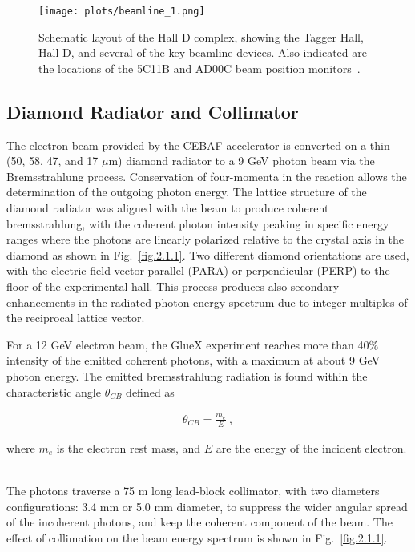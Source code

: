 {\begin{figure}[H]
    \centering
        \texttt{[image: plots/beamline\_1.png]}
        \caption{Schematic layout of the Hall D complex, showing the Tagger Hall, Hall D, and several of the key beamline devices. Also indicated are the locations of the 5C11B and AD00C beam position monitors~\cite{Charles16}.}
        \label{fig.2.1}
\end{figure}

\subsection{Diamond Radiator and Collimator}
\label{p.2.1.1}

The electron beam provided by the CEBAF accelerator is converted on a thin (50, 58, 47, and 17 $\mu$m) diamond radiator to a 9 GeV photon beam via the Bremsstrahlung process. Conservation of four-momenta in the reaction allows the determination of the outgoing photon energy. The lattice structure of the diamond radiator was aligned with the beam to produce coherent bremsstrahlung, with the coherent photon intensity peaking in specific energy ranges where the photons are linearly polarized relative to the crystal axis in the diamond as shown in Fig.~\ref{fig.2.1.1}. Two different diamond orientations are used, with the electric field vector parallel (PARA) or perpendicular (PERP) to the floor of the experimental hall. This process produces also secondary enhancements in the radiated photon energy spectrum due to integer multiples of the reciprocal lattice vector.
~\par For a 12 GeV electron beam, the GlueX experiment reaches more than 40$\%$ intensity of the emitted coherent photons, with a maximum at about 9 GeV photon energy. The emitted bremsstrahlung radiation is found within the characteristic angle $\theta_{CB}$ defined as

\begin{equation}
    \label{eq.2.1.1}
    \begin{aligned}
        \theta_{CB} = \frac{m_{e}}{E}~,
    \end{aligned}
\end{equation}

\noindent where $m_{e}$ is the electron rest mass, and $E$ are the energy of the incident electron.
~\par The photons traverse a 75 m long lead-block collimator, with two diameters configurations: 3.4 mm or 5.0 mm diameter, to suppress the wider angular spread of the incoherent photons, and keep the coherent component of the beam. The effect of collimation on the beam energy spectrum is shown in Fig.~\ref{fig.2.1.1}.

}
